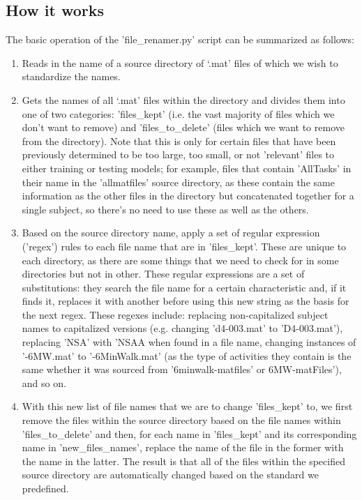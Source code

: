 \documentclass[12pt,twoside]{report}
\begin{document}
\subsection{How it works}

\quad The basic operation of the 'file\_renamer.py' script can be summarized as follows:

\begin{enumerate}
	\item Reads in the name of a source directory of ‘.mat’ files of which we wish to standardize the names.
	\item Gets the names of all ‘.mat’ files within the directory and divides them into one of two categories: 'files\_kept' (i.e. the vast majority of files which we don't want to remove) and 'files\_to\_delete' (files which we want to remove from the directory). Note that this is only for certain files that have been previously determined to be too large, too small, or not 'relevant' files to either training or testing models; for example, files that contain 'AllTasks' in their name in the 'allmatfiles' source directory, as these contain the same information as the other files in the directory but concatenated together for a single subject, so there's no need to use these as well as the others.
	\item Based on the source directory name, apply a set of regular expression ('regex') rules to each file name that are in 'files\_kept'. These are unique to each directory, as there are some things that we need to check for in some directories but not in other. These regular expressions are a set of substitutions: they search the file name for a certain characteristic and, if it finds it, replaces it with another before using this new string as the basis for the next regex. These regexes include: replacing non-capitalized subject names to capitalized versions (e.g. changing 'd4-003.mat' to 'D4-003.mat'), replacing 'NSA' with 'NSAA when found in a file name, changing instances of '-6MW.mat' to '-6MinWalk.mat' (as the type of activities they contain is the same whether it was sourced from '6minwalk-matfiles' or 6MW-matFiles'), and so on.
	\item With this new list of file names that we are to change 'files\_kept' to, we first remove the files within the source directory based on the file names within 'files\_to\_delete' and then, for each name in 'files\_kept' and its corresponding name in 'new\_files\_names', replace the name of the file in the former with the name in the latter. The result is that all of the files within the specified source directory are automatically changed based on the standard we predefined.
\end{enumerate}
\end{document}
